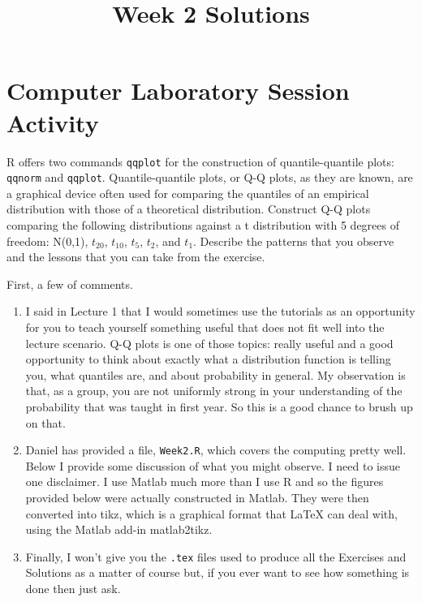 
\title{Week 2 Solutions}



\maketitle

\section*{Computer Laboratory Session Activity}
R offers two commands \texttt{qqplot} for the construction of quantile-quantile plots:
\texttt{qqnorm} and \texttt{qqplot}.
Quantile-quantile plots, or Q-Q plots, as they are known, are a graphical device often used for
comparing the quantiles of an empirical distribution with those of a theoretical distribution.
Construct Q-Q plots comparing the following distributions against a t distribution with 5 degrees
of freedom: N(0,1), \( t_{20} \), \( t_{10} \), \( t_{5} \), \( t_{2} \), and \( t_{1} \).
Describe the patterns that you observe and the lessons that you can take from the exercise.\bigskip

\noindent\solution

\noindent First, a few of comments.
\begin{enumerate}
   \item I said in Lecture 1 that I would sometimes use the tutorials as an opportunity for you to
         teach yourself something useful that does not fit well into the lecture scenario.  Q-Q
         plots is one of those topics: really useful and a good opportunity to think about exactly
         what a distribution function is telling you, what quantiles are, and about probability in
         general.  My observation is that, as a group, you are not uniformly strong in your
         understanding of the probability that was taught in first year.  So this is a good chance
         to brush up on that.

   \item Daniel has provided a file, \texttt{Week2.R}, which covers the computing pretty well. Below
         I provide some discussion of what you might observe.  I need to issue one disclaimer.  I
         use Matlab much more than I use R and so the figures provided below were actually
         constructed in Matlab.  They were then converted into tikz, which is a graphical format
         that LaTeX can deal with, using the Matlab add-in matlab2tikz.

   \item Finally, I won't give you the \texttt{.tex} files used to produce all the Exercises and
         Solutions as a matter of course but, if you ever want to see how something is done then just
         ask.
\end{enumerate}

